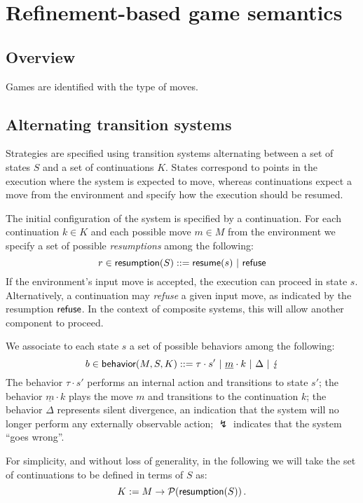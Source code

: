 \section{Refinement-based game semantics}

\subsection{Overview}



Games are identified with the type of moves.

\subsection{Alternating transition systems}

Strategies are specified using transition systems
alternating between a set of states $S$ and
a set of continuations $K$.
States correspond to points in the execution
where the system is expected to move,
whereas continuations expect a move from the environment
and specify how the execution should be resumed.

The initial configuration of the system
is specified by a continuation.
For each continuation $k \in K$
and each possible move $m \in M$ from the environment
we specify a set of possible \emph{resumptions}
among the following:
\[ r \in  \textsf{resumption} (S) ::=
	 \textsf{resume} (s) \ |\  \textsf{refuse}  \]
If the environment's input move is accepted,
the execution can proceed in state $s$.
Alternatively,
a continuation may \emph{refuse} a given input move,
as indicated by the resumption $ \textsf{refuse} $.
In the context of composite systems,
this will allow another component to proceed.

We associate to each state $s$ a set of possible
behaviors among the following:
\[ b \in \kw{behavior}(M,S,K) ::=
	\tau \cdot s' \ |\
	\underline{m} \cdot k \ | \
	\Delta \ |\ 
	\lightning \]
The behavior $\tau \cdot s'$
performs an internal action and transitions to state $s'$;
the behavior $\underline{m} \cdot k$
plays the move $m$ and transitions to the continuation $k$;
the behavior $\Delta$ represents silent divergence,
an indication that the system will no longer perform
any externally observable action;
$\lightning$ indicates that the system ``goes wrong''.

For simplicity, and without loss of generality,
in the following we will take the set of continuations
to be defined in terms of $S$ as:
\[ K := M \rightarrow \mathcal{P}( \textsf{resumption} (S)) \,. \]

